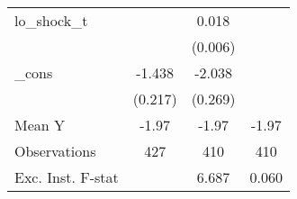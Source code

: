 {\begin{tabular}{l*{3}{c}}
\addlinespace
lo\_shock\_t  &                     &       0.018\sym{***}&                     \\
            &                     &     (0.006)         &                     \\
\addlinespace
\_cons      &      -1.438\sym{***}&      -2.038\sym{***}&                     \\
            &     (0.217)         &     (0.269)         &                     \\
\midrule
Mean Y      &       -1.97         &       -1.97         &       -1.97         \\
Observations&         427         &         410         &         410         \\
Exc. Inst. F-stat&                     &       6.687         &       0.060         \\
\bottomrule
\end{tabular}
}
